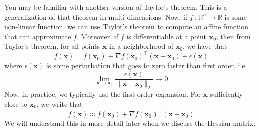 \documentclass[12pt]{article}
\begin{document}
\noindent You may be familiar with another version of Taylor's theorem. This is a generalization of that theorem in multi-dimensions. Now, if $f\,:\,\mathbb{R}^n\to\mathbb{R}$ is some non-linear function, we can use Taylor's theorem to compute an affine function that can approximate $f$. Moreover, if $f$ is differentiable at a point $\mathbf{x}_0$, then from Taylor's theorem, for all points $\mathbf{x}$ in a neighborhood of $\mathbf{x}_0$, we have that $$f(\mathbf{x}) = f(\mathbf{x}_0) + \nabla f(\mathbf{x}_0)^\top(\mathbf{x}-\mathbf{x}_0) + \epsilon(\mathbf{x})$$ where $\epsilon(\mathbf{x})$ is some perturbation that goes to zero faster than first order, i.e. $$\lim_{\mathbf{x}\to\mathbf{x}_0} \frac{\epsilon(\mathbf{x})}{\|\mathbf{x}-\mathbf{x}_0\|_2} \to 0$$ Now, in practice, we typically use the first order expansion. For $\mathbf{x}$ sufficiently close to $\mathbf{x}_0$, we write that $$f(\mathbf{x})\approx f(\mathbf{x}_0) + \nabla f(\mathbf{x}_0)^\top(\mathbf{x}-\mathbf{x}_0)$$ We will understand this in more detail later when we discuss the Hessian matrix.
\end{document}
